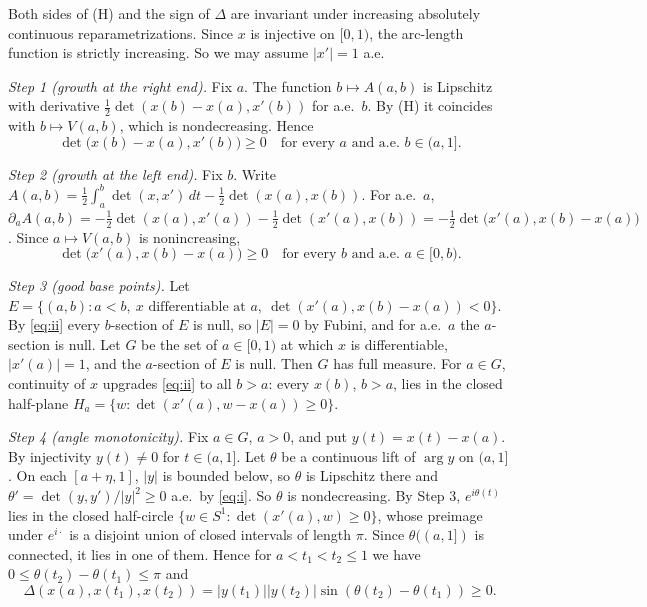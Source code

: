 \documentclass[11pt]{amsart}
\theoremstyle{definition}
\begin{document}
Both sides of (H) and the sign of $\Delta$ are invariant under increasing absolutely continuous reparametrizations.
Since $x$ is injective on $[0,1)$, the arc-length function is strictly increasing. So we may assume $|x'|=1$ a.e.

\emph{Step 1 (growth at the right end).} Fix $a$. The function $b\mapsto A(a,b)$ is Lipschitz with derivative $\frac12\det(x(b)-x(a),x'(b))$
for a.e.\ $b$. By (H) it coincides with $b\mapsto V(a,b)$, which is nondecreasing. Hence
\begin{equation}\label{eq:i}
\det\big(x(b)-x(a),x'(b)\big)\ge0\quad\text{for every }a\text{ and a.e. }b\in(a,1].
\end{equation}

\emph{Step 2 (growth at the left end).} Fix $b$. Write $A(a,b)=\frac12\int_a^b\det(x,x')\,dt-\frac12\det(x(a),x(b))$.
For a.e.\ $a$, $\partial_aA(a,b)=-\frac12\det(x(a),x'(a))-\frac12\det(x'(a),x(b))=-\frac12\det\big(x'(a),x(b)-x(a)\big)$.
Since $a\mapsto V(a,b)$ is nonincreasing,
\begin{equation}\label{eq:ii}
\det\big(x'(a),x(b)-x(a)\big)\ge0\quad\text{for every }b\text{ and a.e. }a\in[0,b).
\end{equation}

\emph{Step 3 (good base points).} Let $E=\{(a,b):a<b,\ x\text{ differentiable at }a,\ \det(x'(a),x(b)-x(a))<0\}$.
By \eqref{eq:ii} every $b$-section of $E$ is null, so $|E|=0$ by Fubini, and for a.e.\ $a$ the $a$-section is null.
Let $G$ be the set of $a\in[0,1)$ at which $x$ is differentiable, $|x'(a)|=1$, and the $a$-section of $E$ is null.
Then $G$ has full measure. For $a\in G$, continuity of $x$ upgrades \eqref{eq:ii} to all $b>a$: every $x(b)$, $b>a$, lies in the closed half-plane
$H_a=\{w:\det(x'(a),w-x(a))\ge0\}$.

\emph{Step 4 (angle monotonicity).} Fix $a\in G$, $a>0$, and put $y(t)=x(t)-x(a)$. By injectivity $y(t)\ne0$ for $t\in(a,1]$.
Let $\theta$ be a continuous lift of $\arg y$ on $(a,1]$. On each $[a+\eta,1]$, $|y|$ is bounded below, so $\theta$ is Lipschitz there
and $\theta'=\det(y,y')/|y|^2\ge0$ a.e.\ by \eqref{eq:i}. So $\theta$ is nondecreasing.
By Step 3, $e^{i\theta(t)}$ lies in the closed half-circle $\{w\in S^1:\det(x'(a),w)\ge0\}$, whose preimage under $e^{i\cdot}$ is a disjoint
union of closed intervals of length $\pi$. Since $\theta((a,1])$ is connected, it lies in one of them.
Hence for $a<t_1<t_2\le1$ we have $0\le\theta(t_2)-\theta(t_1)\le\pi$ and
\[
\Delta(x(a),x(t_1),x(t_2))=|y(t_1)||y(t_2)|\sin(\theta(t_2)-\theta(t_1))\ge0.
\]
\end{document}
